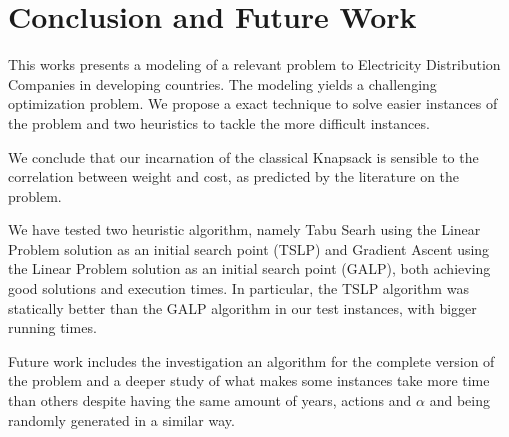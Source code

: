 \section{Conclusion and Future Work}
\label{sec:con}

This works presents a modeling of a relevant problem to Electricity Distribution Companies in developing countries.
The modeling yields a challenging optimization problem. We propose a exact technique to solve easier instances
of the problem and two heuristics to tackle the more difficult instances.

We conclude that our incarnation  of the classical Knapsack is sensible to the correlation between weight and cost, as
predicted by the literature on the problem.

We have tested two heuristic algorithm, namely Tabu Searh using the Linear Problem solution as an initial search point
(TSLP) and Gradient Ascent using the Linear Problem solution as an initial search point (GALP), both achieving good solutions and
execution times. In particular, the TSLP algorithm was statically better than the GALP algorithm
in our test instances, with bigger running times.

Future work includes the investigation an algorithm for the complete version of the problem and
a deeper study of what makes some instances take more time than others despite 
having the same amount of years, actions and $\alpha$ and being randomly generated
in a similar way.

\vspace{1cm}
